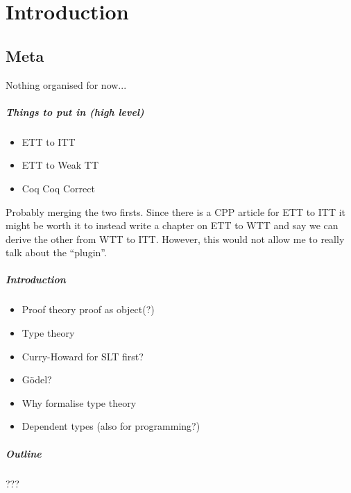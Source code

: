 \setchapterpreamble[u]{\margintoc}
\chapter{Introduction}


\section{Meta}

Nothing organised for now...

\paragraph{Things to put in (high level)}

\begin{itemize}
  \item ETT to ITT
  \item ETT to Weak TT
  \item Coq Coq Correct
\end{itemize}
%
Probably merging the two firsts. Since there is a CPP article for ETT to ITT
it might be worth it to instead write a chapter on ETT to WTT and say we can
derive the other from WTT to ITT.
However, this would not allow me to really talk about the ``plugin''.

\paragraph{Introduction}

\begin{itemize}
  \item Proof theory proof as object(?)
  \item Type theory
  \item Curry-Howard for SLT first?
  \item Gödel?
  \item Why formalise type theory
  \item Dependent types (also for programming?)
\end{itemize}

\paragraph{Outline}

???